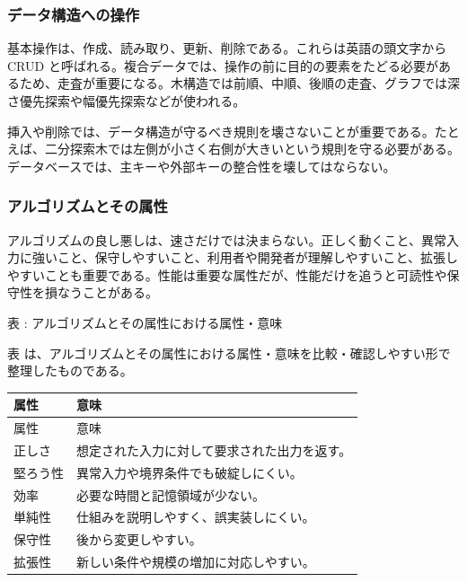 \subsubsection{データ構造への操作}

基本操作は、作成、読み取り、更新、削除である。これらは英語の頭文字から CRUD と呼ばれる。複合データでは、操作の前に目的の要素をたどる必要があるため、走査が重要になる。木構造では前順、中順、後順の走査、グラフでは深さ優先探索や幅優先探索などが使われる。

挿入や削除では、データ構造が守るべき規則を壊さないことが重要である。たとえば、二分探索木では左側が小さく右側が大きいという規則を守る必要がある。データベースでは、主キーや外部キーの整合性を壊してはならない。

\subsubsection{アルゴリズムとその属性}

アルゴリズムの良し悪しは、速さだけでは決まらない。正しく動くこと、異常入力に強いこと、保守しやすいこと、利用者や開発者が理解しやすいこと、拡張しやすいことも重要である。性能は重要な属性だが、性能だけを追うと可読性や保守性を損なうことがある。

\par\smallskip\noindent{}\label{tab:ch16-08}表 \thetable: アルゴリズムとその属性における属性・意味\par\smallskip
表 \thetable は、アルゴリズムとその属性における属性・意味を比較・確認しやすい形で整理したものである。\par\smallskip
\begin{longtable}{>{\raggedright\arraybackslash}p{}>{\raggedright\arraybackslash}p{}}
\toprule
属性 & 意味 \\
\midrule
\endfirsthead
\toprule
属性 & 意味 \\
\midrule
\endhead
正しさ & 想定された入力に対して要求された出力を返す。 \\
堅ろう性 & 異常入力や境界条件でも破綻しにくい。 \\
効率 & 必要な時間と記憶領域が少ない。 \\
単純性 & 仕組みを説明しやすく、誤実装しにくい。 \\
保守性 & 後から変更しやすい。 \\
拡張性 & 新しい条件や規模の増加に対応しやすい。 \\
\bottomrule
\end{longtable}

